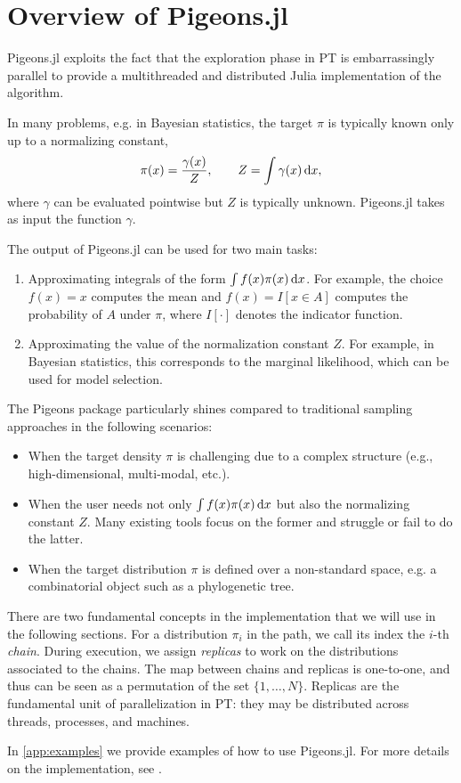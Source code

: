 \section{Overview of Pigeons.jl}\label{sec:overview}

Pigeons.jl exploits the fact that the exploration phase in PT is embarrassingly parallel
to provide a multithreaded and distributed Julia implementation of the algorithm.

In many problems, e.g. in Bayesian 
statistics, the target $\pi$ is typically known only up to a normalizing constant, 
\[
\label{eq:normalizing_constant}
  \pi(x) = \frac{\gamma(x)}{Z}, \qquad Z = \int \gamma(x) \, \dee x,
\]  
where $\gamma$ can be evaluated pointwise but $Z$ is typically unknown.
Pigeons.jl takes as input the function $\gamma$.


The output of Pigeons.jl can be used for two main tasks:
\begin{enumerate}
    \item Approximating integrals of the form $\int f(x) \pi(x) \, \mathrm{d} x$.  
    For example, the choice $f(x) = x$ computes the mean and 
    $f(x) = I[x \in A]$ computes the probability of $A$ under $\pi$,
    where $I[\cdot]$ denotes the indicator function.

    \item Approximating the value of the normalization constant $Z$. For 
    example, in Bayesian statistics, this corresponds to the 
    marginal likelihood, which can be used for model selection. 
\end{enumerate}
The Pigeons package particularly shines compared to traditional sampling approaches in the 
following scenarios:
\begin{itemize}
    \item When the target density $\pi$ is challenging due to a complex structure 
    (e.g., high-dimensional, multi-modal, etc.).
    
    \item When the user needs not only $\int f(x) \pi(x) \, \mathrm{d} x$ but also
    the normalizing constant $Z$. 
    Many existing tools focus on the former and struggle or fail to do the latter. 
    
    \item When the target distribution $\pi$ is defined over a non-standard space, 
    e.g. a combinatorial object such as a phylogenetic tree.  
\end{itemize}

There are two fundamental concepts in the implementation that we will use
in the following sections. For a distribution $\pi_i$ in the path, we call its
index the $i$-th \emph{chain}. During execution, we assign \emph{replicas} to 
work on the distributions associated to the chains. The map between chains and
replicas is one-to-one, and thus can be seen as a permutation of the 
set $\{1,\dots,N\}$. Replicas are the fundamental unit of parallelization in PT:
they may be distributed across threads, processes, and machines. 

In \cref{app:examples} we provide examples of how to use Pigeons.jl. For more details
on the implementation, see \citet{surjanovic2025pigeons}.

